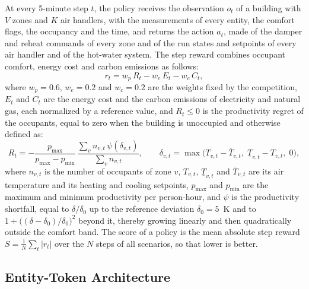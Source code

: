 \documentclass{article}
\begin{document}
At every 5-minute step $t$, the policy receives the observation $o_t$ of a building with $V$ zones and $K$ air handlers, with the measurements of every entity, the comfort flags, the occupancy and the time, and returns the action $a_t$, made of the damper and reheat commands of every zone and of the run states and setpoints of every air handler and of the hot-water system. The step reward combines occupant comfort, energy cost and carbon emissions as follows:
\begin{equation}
r_t = w_p\, R_t - w_e\, E_t - w_c\, C_t ,
\label{eq:reward}
\end{equation}
where $w_p = 0.6$, $w_e = 0.2$ and $w_c = 0.2$ are the weights fixed by the competition, $E_t$ and $C_t$ are the energy cost and the carbon emissions of electricity and natural gas, each normalized by a reference value, and $R_t \le 0$ is the productivity regret of the occupants, equal to zero when the building is unoccupied and otherwise defined as:
\begin{equation}
R_t = -\frac{p_{\max}}{p_{\max} - p_{\min}} \, \frac{\sum_v n_{v,t}\, \psi(\delta_{v,t})}{\sum_v n_{v,t}}, \qquad \delta_{v,t} = \max\big(T_{v,t} - \overline{T}_{v,t},\; \underline{T}_{v,t} - T_{v,t},\; 0\big),
\label{eq:regret}
\end{equation}
where $n_{v,t}$ is the number of occupants of zone $v$, $T_{v,t}$, $\underline{T}_{v,t}$ and $\overline{T}_{v,t}$ are its air temperature and its heating and cooling setpoints, $p_{\max}$ and $p_{\min}$ are the maximum and minimum productivity per person-hour, and $\psi$ is the productivity shortfall, equal to $\delta/\delta_0$ up to the reference deviation $\delta_0 = 5$~K and to $1 + \big((\delta - \delta_0)/\delta_0\big)^2$ beyond it, thereby growing linearly and then quadratically outside the comfort band. The score of a policy is the mean absolute step reward $S = \frac{1}{N}\sum_t |r_t|$ over the $N$ steps of all scenarios, so that lower is better.

\subsection{Entity-Token Architecture}
\end{document}
